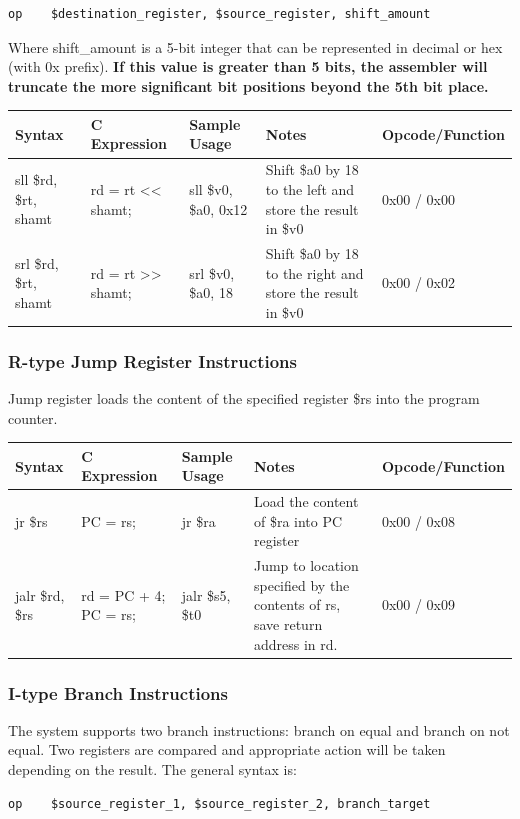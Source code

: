 \documentclass{article}
\begin{document}
\begin{verbatim}
op    $destination_register, $source_register, shift_amount
\end{verbatim}

Where shift\_amount is a 5-bit integer that can be represented in decimal or hex (with 0x prefix). \textbf{If this value is greater than 5 bits, the assembler will truncate the more significant bit positions beyond the 5th bit place. }

\begin{tabular}{| l | l | l | p{5cm} | l |}
\hline
Syntax & C Expression & Sample Usage & Notes & Opcode/Function \\
\hline
sll \$rd, \$rt, shamt & rd = rt << shamt; & sll \$v0, \$a0, 0x12 & Shift \$a0 by 18 to the left and store the result in \$v0 & 0x00 / 0x00 \\
srl \$rd, \$rt, shamt & rd = rt >> shamt; & srl \$v0, \$a0, 18 & Shift \$a0 by 18 to the right and store the result in \$v0 & 0x00 / 0x02 \\
\hline
\end{tabular}
\subsubsection{R-type Jump Register Instructions}
Jump register loads the content of the specified register \$rs into the program counter. 

\begin{tabular}{| l | l | l | p{5cm} | l |}
\hline
Syntax & C Expression & Sample Usage & Notes & Opcode/Function \\
\hline
jr \$rs & PC = rs; & jr \$ra & Load the content of \$ra into PC register & 0x00 / 0x08 \\
jalr \$rd, \$rs & rd = PC + 4; PC = rs; & jalr \$s5, \$t0 & Jump to location specified by the contents of rs, save return address in rd. & 0x00 / 0x09 \\
\hline
\end{tabular}

\subsubsection{I-type Branch Instructions}
The system supports two branch instructions: branch on equal and branch on not equal. Two registers are compared and appropriate action will be taken depending on the result. The general syntax is: 

\begin{verbatim}
op    $source_register_1, $source_register_2, branch_target
\end{verbatim}
\end{document}
